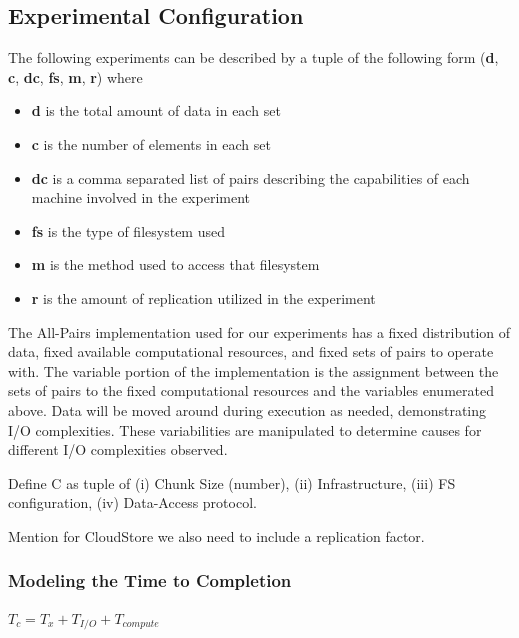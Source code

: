 \documentclass{rspublic}
\begin{document}
\subsection{Experimental Configuration}

The following experiments can be described by a tuple of the following
form (\textbf{d}, \textbf{c}, \textbf{dc}, \textbf{fs}, \textbf{m},
\textbf{r}) where

\begin{itemize} 
\item \textbf{d} is the total amount of data in each set
\item \textbf{c} is the number of elements in each set
\item \textbf{dc} is a comma separated list of pairs describing the
capabilities of each machine involved in the experiment
\item \textbf{fs} is the type of filesystem used
\item \textbf{m} is the method used to access that filesystem
\item \textbf{r} is the amount of replication utilized in the experiment
\end{itemize}

The All-Pairs implementation used for our experiments has a fixed
distribution of data, fixed available computational resources, and fixed
sets of pairs to operate with.  The variable portion of the
implementation is the assignment between the sets of pairs to the fixed
computational resources and the variables enumerated above.  Data will
be moved around during execution as needed, demonstrating I/O
complexities.  These variabilities are manipulated to determine causes
for different I/O complexities observed.

Define C as  tuple of (i) Chunk Size (number), (ii) Infrastructure,
(iii) FS configuration, (iv) Data-Access protocol.

Mention for CloudStore we also need to include a replication factor.

\subsubsection{Modeling the Time to Completion}

$T_c = T_x + T_{I/O} + T_{compute}$
\end{document}
